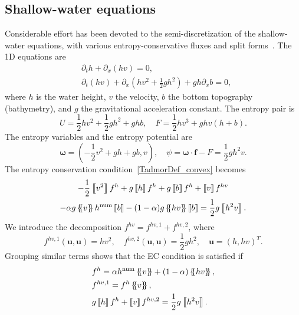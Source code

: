 \documentclass[]{scrartcl}
\newcommand*{\ldblbrace}{\{\mskip-5mu \left \{}
\newcommand*{\rdblbrace}{ \}\mskip-5mu \right \}}
\newcommand{\mean}[1]{\left\ldblbrace #1 \right\rdblbrace}
\renewcommand{\vec}[1]{\boldsymbol{#1}}
\newcommand{\jump}[1]{\left\llbracket #1  \right\rrbracket}
\theoremstyle{definition}
\begin{document}
\subsection{Shallow-water equations}

Considerable effort has been devoted to the semi-discretization of the shallow-water equations, with various entropy-conservative fluxes and split forms~\cite{FJORDHOLM20115587,gassner2016shallowwater,WINTERMEYER2017200,Ranocha2017}.
The 1D equations are
\begin{equation}
\begin{aligned}
    &\partial_t h + \partial_x \left ( hv \right ) = 0,\\
    & \partial_t (hv) + \partial_x \left ( hv^2 + \frac{1}{2}g h^2 \right ) + g h \partial_x b = 0,
\end{aligned}
\end{equation}
where $h$ is the water height, $v$ the velocity, $b$ the bottom topography (bathymetry), and $g$ the gravitational acceleration constant.
The entropy pair is
\begin{equation}
U = \frac{1}{2}hv^2 + \frac{1}{2}gh^2 + ghb, \quad F = \frac{1}{2}h v^3 + ghv(h + b).
\end{equation}
The entropy variables and the entropy potential are
\begin{equation}
\vec{\omega} = \left (-\frac{1}{2}v^2 + gh + gb, v \right ), \quad \psi = \vec{\omega} \cdot \vec{f} - F = \frac{1}{2} g h^2 v.
\end{equation}
The entropy conservation condition~\eqref{TadmorDef_convex} becomes
\begin{multline}
-\frac{1}{2}\jump{v^2}f^h + g \jump{h}f^h + g \jump{b} f^h + \jump{v}f^{hv} \\
- \alpha g \mean{v}h^{\mathrm{num}} \jump{b} -(1 - \alpha)g \mean{hv} \jump{b} = \frac{1}{2}g\jump{h^2 v}.
\end{multline}
We introduce the decomposition $f^{hv} = f^{hv,1} + f^{hv,2}$, where
\begin{equation}
f^{hv,1}(\vec{u},\vec{u}) = h v^2, \quad f^{hv,2}(\vec{u},\vec{u}) = \frac{1}{2} g h^2, \quad \vec{u} = (h, hv)^T.
\end{equation}
Grouping similar terms shows that the EC condition is satisfied if
\begin{equation}
    \begin{aligned}
& f^h = \alpha h^{\mathrm{num}} \mean{v} + (1-\alpha) \mean{hv},\\
& f^{hv,1} = f^h \mean{v}, \\
& g \jump{h} f^h + \jump{v} f^{hv,2} = \frac{1}{2} g \jump{h^2 v}.
    \end{aligned}
    \label{SW_conditions}
\end{equation}
\end{document}
